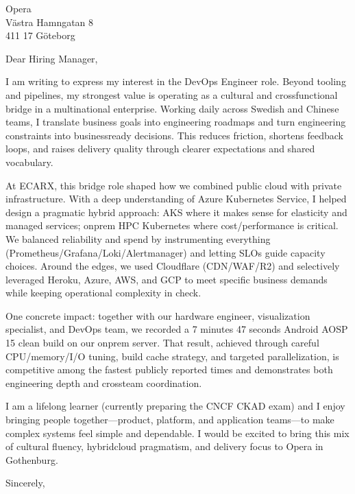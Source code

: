 \documentclass[a4paper,10pt]{letter}
\begin{document}
\pagestyle{empty}
\begin{letter}{Opera\\V\"{a}stra Hamngatan 8\\411 17 G\"{o}teborg}
\opening{Dear Hiring Manager,}

I am writing to express my interest in the DevOps Engineer role. Beyond tooling and pipelines, my strongest value is operating as a cultural and cross\-functional bridge in a multi\-national enterprise. Working daily across Swedish and Chinese teams, I translate business goals into engineering roadmaps and turn engineering constraints into business\-ready decisions. This reduces friction, shortens feedback loops, and raises delivery quality through clearer expectations and shared vocabulary.

At ECARX, this bridge role shaped how we combined public cloud with private infrastructure. With a deep understanding of Azure Kubernetes Service, I helped design a pragmatic hybrid approach: AKS where it makes sense for elasticity and managed services; on\-prem HPC Kubernetes where cost/performance is critical. We balanced reliability and spend by instrumenting everything (Prometheus/Grafana/Loki/Alertmanager) and letting SLOs guide capacity choices. Around the edges, we used Cloudflare (CDN/WAF/R2) and selectively leveraged Heroku, Azure, AWS, and GCP to meet specific business demands while keeping operational complexity in check.

One concrete impact: together with our hardware engineer, visualization specialist, and DevOps team, we recorded a 7 minutes 47 seconds Android AOSP 15 clean build on our on\-prem server. That result, achieved through careful CPU/memory/I/O tuning, build cache strategy, and targeted parallelization, is competitive among the fastest publicly reported times and demonstrates both engineering depth and cross\-team coordination.

I am a lifelong learner (currently preparing the CNCF CKAD exam) and I enjoy bringing people together—product, platform, and application teams—to make complex systems feel simple and dependable. I would be excited to bring this mix of cultural fluency, hybrid\-cloud pragmatism, and delivery focus to Opera in Gothenburg.

\closing{Sincerely,}
\signature{Hongzhi Li\\Ebbe Lieberathsgatan 27\\412 65 G\"{o}teborg\\hongzhili01@gmail.com\\0728384299\\2025.09.12}
\end{letter}
\end{document}
